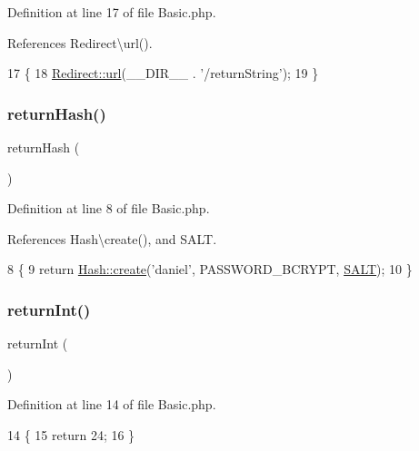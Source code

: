 Definition at line 17 of file Basic.\+php.



References Redirect\textbackslash{}url().


\begin{DoxyCode}
17                                     \{
18         \hyperlink{class_redirect_a8c51feb32df9ae35002451714b7a9a73}{Redirect::url}(\_\_DIR\_\_ . \textcolor{stringliteral}{'/returnString'});
19     \}
\end{DoxyCode}
\hypertarget{class_basic_a16df2136bd66a75022f350d583e6c060}{}\label{class_basic_a16df2136bd66a75022f350d583e6c060} 
\subsubsection{\texorpdfstring{return\+Hash()}{returnHash()}}
{\footnotesize\ttfamily return\+Hash (\begin{DoxyParamCaption}{ }\end{DoxyParamCaption})}



Definition at line 8 of file Basic.\+php.



References Hash\textbackslash{}create(), and S\+A\+LT.


\begin{DoxyCode}
8                                  \{
9         \textcolor{keywordflow}{return} \hyperlink{class_hash_a8e076eebb2dc8fc9cb289212c79ad9b8}{Hash::create}(\textcolor{stringliteral}{'daniel'}, PASSWORD\_BCRYPT, \hyperlink{config_8php_a6d448b74f10f8080293b329a47a046b4}{SALT});
10     \}
\end{DoxyCode}
\hypertarget{class_basic_a8d2918087022004ef5ad62d8f76a73d7}{}\label{class_basic_a8d2918087022004ef5ad62d8f76a73d7} 
\subsubsection{\texorpdfstring{return\+Int()}{returnInt()}}
{\footnotesize\ttfamily return\+Int (\begin{DoxyParamCaption}{ }\end{DoxyParamCaption})}



Definition at line 14 of file Basic.\+php.


\begin{DoxyCode}
14                                 \{
15         \textcolor{keywordflow}{return} 24;
16     \}
\end{DoxyCode}
\hypertarget{class_basic_aab9c1fc26dd9ab7939d5eb9e77c2c4a5}{}\label{class_basic_aab9c1fc26dd9ab7939d5eb9e77c2c4a5} 
